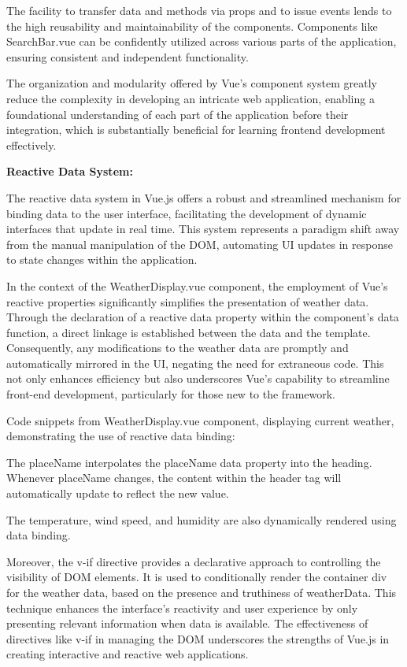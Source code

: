 The facility to transfer data and methods via props and to issue events lends to the high reusability and maintainability of the components. Components like SearchBar.vue can be confidently utilized across various parts of the application, ensuring consistent and independent functionality.

The organization and modularity offered by Vue’s component system greatly reduce the complexity in developing an intricate web application, enabling a foundational understanding of each part of the application before their integration, which is substantially beneficial for learning frontend development effectively.

\textbf{Reactive Data System:}

The reactive data system in Vue.js offers a robust and streamlined mechanism for binding data to the user interface, facilitating the development of dynamic interfaces that update in real time. This system represents a paradigm shift away from the manual manipulation of the DOM, automating UI updates in response to state changes within the application.

In the context of the WeatherDisplay.vue component, the employment of Vue's reactive properties significantly simplifies the presentation of weather data. Through the declaration of a reactive data property within the component's data function, a direct linkage is established between the data and the template. Consequently, any modifications to the weather data are promptly and automatically mirrored in the UI, negating the need for extraneous code. This not only enhances efficiency but also underscores Vue's capability to streamline front-end development, particularly for those new to the framework.

Code snippets from WeatherDisplay.vue component, displaying current weather, demonstrating the use of reactive data binding: 



The {{ placeName }} interpolates the placeName data property into the heading. Whenever placeName changes, the content within the header tag will automatically update to reflect the new value.

The temperature, wind speed, and humidity are also dynamically rendered using data binding. 

Moreover, the v-if directive provides a declarative approach to controlling the visibility of DOM elements. It is used to conditionally render the container div for the weather data, based on the presence and truthiness of weatherData. This technique enhances the interface's reactivity and user experience by only presenting relevant information when data is available. The effectiveness of directives like v-if in managing the DOM underscores the strengths of Vue.js in creating interactive and reactive web applications.

